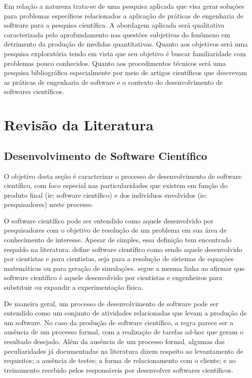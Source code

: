 \documentclass[
	article,			%
	11pt,				%
	oneside,			%
	a4paper,			%
	english,			%
	brazil,				%
	sumario=tradicional
	]{abntex2}
\begin{document}
Em relação a natureza trata-se de uma pesquisa aplicada que visa gerar soluções para problemas específicos relacionados a aplicação de práticas de engenharia de software para a pesquisa científica. A abordagem aplicada será qualitativa caracterizada pelo aprofundamento nas questões subjetivas do fenômeno em detrimento da produção de medidas quantitativas. Quanto aos objetivos será uma pesquisa exploratória tendo em vista que seu objetivo é buscar familiaridade com problemas pouco conhecidos. Quanto aos procedimentos técnicos será uma pesquisa bibliográfica especialmente por meio de artigos científicos que descrevam as práticas de engenharia de software e o contexto do desenvolvimento de softwares científicos.

\section*{Revisão da Literatura}

\subsection*{Desenvolvimento de Software Científico}
\label{subsec:scientific_software_development}
O objetivo desta seção é caracterizar o processo de desenvolvimento de software científico, com foco especial nas particularidades que existem em função do produto final (ie: software científico) e dos indivíduos envolvidos (ie: pesquisadores) neste processo.

O software científico pode ser entendido como aquele desenvolvido por pesquisadores com o objetivo de resolução de um problema em sua área de conhecimento de interesse. Apesar de simples, essa definição tem encontrado respaldo na literatura.  define software científico como sendo aquele desenvolvido por cientistas e para cientistas, seja para a resolução de sistemas de equações matemáticas ou para geração de simulações.  segue a mesma linha ao afirmar que software científico é aquele desenvolvido por cientistas e engenheiros para substituir ou expandir a experimentação física.

De maneira geral, um processo de desenvolvimento de software pode ser entendido como um conjunto de atividades relacionadas que levam a produção de um software. No caso da produção de software científico, a regra parece ser a ausência de um processo formal, com a realização de tarefas ad-hoc que geram o resultado desejado. Além da ausência de um processo formal, algumas das peculiaridades já documentadas na literatura dizem respeito ao levantamento de requisitos; a ausência de testes; a forma de relacionamento com o cliente; e ao treinamento recebido pelos responsáveis por desenvolver softwares científicos.
\end{document}
